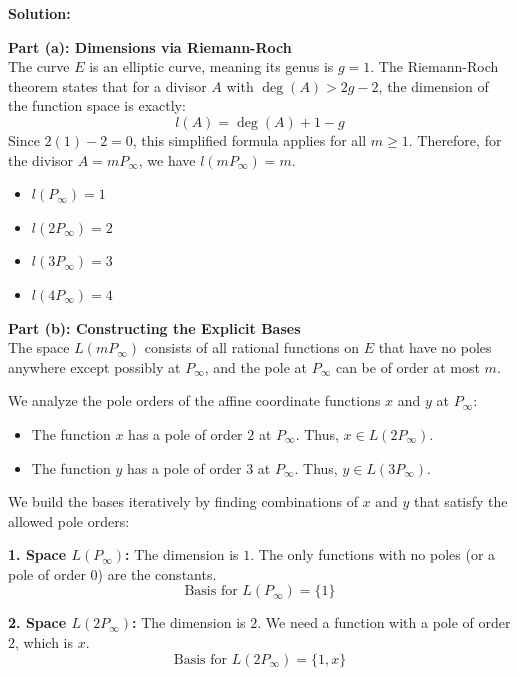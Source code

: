 \documentclass[11pt]{article}
\begin{document}
	\begin{mdframed}[backgroundcolor=gray!5, linecolor=gray!50, linewidth=1pt]
		\textbf{Solution:}
		
		\vspace{0.3cm}
		\textbf{Part (a): Dimensions via Riemann-Roch} \\
		The curve $E$ is an elliptic curve, meaning its genus is $g = 1$. The Riemann-Roch theorem states that for a divisor $A$ with $\deg(A) > 2g - 2$, the dimension of the function space is exactly:
		$$l(A) = \deg(A) + 1 - g$$
		Since $2(1) - 2 = 0$, this simplified formula applies for all $m \geq 1$. Therefore, for the divisor $A = mP_\infty$, we have $l(mP_\infty) = m$.
		\begin{itemize}
			\item $l(P_\infty) = 1$
			\item $l(2P_\infty) = 2$
			\item $l(3P_\infty) = 3$
			\item $l(4P_\infty) = 4$
		\end{itemize}
		
		\vspace{0.3cm}
		\textbf{Part (b): Constructing the Explicit Bases} \\
		The space $L(mP_\infty)$ consists of all rational functions on $E$ that have no poles anywhere except possibly at $P_\infty$, and the pole at $P_\infty$ can be of order at most $m$.
		
		We analyze the pole orders of the affine coordinate functions $x$ and $y$ at $P_\infty$:
		\begin{itemize}
			\item The function $x$ has a pole of order $2$ at $P_\infty$. Thus, $x \in L(2P_\infty)$.
			\item The function $y$ has a pole of order $3$ at $P_\infty$. Thus, $y \in L(3P_\infty)$.
		\end{itemize}
		
		We build the bases iteratively by finding combinations of $x$ and $y$ that satisfy the allowed pole orders:
		
		\textbf{1. Space $L(P_\infty)$:} 
		The dimension is $1$. The only functions with no poles (or a pole of order 0) are the constants.
		$$ \text{Basis for } L(P_\infty) = \{ 1 \} $$
		
		\textbf{2. Space $L(2P_\infty)$:} 
		The dimension is $2$. We need a function with a pole of order $2$, which is $x$.
		$$ \text{Basis for } L(2P_\infty) = \{ 1, x \} $$
		

\end{mdframed}
\end{document}
